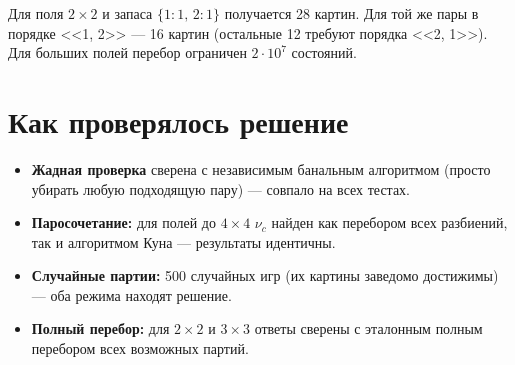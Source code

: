 \documentclass[12pt,a4paper]{article}
\begin{document}
Для поля $2\times2$ и запаса $\{1{:}1,\,2{:}1\}$ получается 28 картин.
Для той же пары в порядке <<1, 2>> --- 16 картин (остальные 12 требуют
порядка <<2, 1>>). Для больших полей перебор ограничен $2\cdot10^7$
состояний.

\section{Как проверялось решение}

\begin{itemize}
  \item \textbf{Жадная проверка} сверена с независимым банальным
        алгоритмом (просто убирать любую подходящую пару) --- совпало
        на всех тестах.
  \item \textbf{Паросочетание:} для полей до $4\times4$ $\nu_c$ найден
        как перебором всех разбиений, так и алгоритмом Куна ---
        результаты идентичны.
  \item \textbf{Случайные партии:} 500 случайных игр (их картины заведомо
        достижимы) --- оба режима находят решение.
  \item \textbf{Полный перебор:} для $2\times2$ и $3\times3$ ответы
        сверены с эталонным полным перебором всех возможных партий.
\end{itemize}
\end{document}
